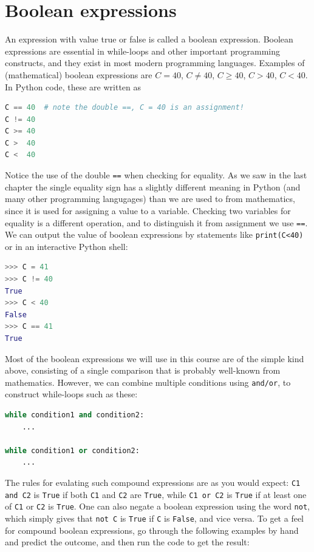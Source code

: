 \documentclass[graybox,envcountchap,sectrefs,final]{svmonodo}
\begin{document}
\section{Boolean expressions}
An expression with value true or false is called a boolean expression. Boolean expressions are essential in
while-loops and other important programming constructs, and they exist in most modern programming languages. Examples
of (mathematical) boolean expressions are $C=40$, $C\neq 40$, $C\geq 40$, $C>40$, $C<40$. In Python code, these
are written as
\begin{lstlisting}[language=Python,style=blue1bar]
C == 40  # note the double ==, C = 40 is an assignment!
C != 40
C >= 40
C >  40
C <  40
\end{lstlisting}
Notice the use of the double \texttt{==} when checking for equality. As we saw in the last chapter the single equality sign
has a slightly different meaning in Python (and many other programming langugages) than we are used to from mathematics,
since it is used for assigning a value to a variable. Checking two variables for equality is a different operation, and
to distinguish it from assignment we use \texttt{==}.
We can output the value of boolean expressions by statements like \texttt{print(C<40)} or in an interactive Python shell:
\begin{lstlisting}[language=Python,style=blue1]
>>> C = 41
>>> C != 40
True
>>> C < 40
False
>>> C == 41
True
\end{lstlisting}
Most of the boolean expressions we will use in this course are of the simple kind above, consisting of a single
comparison that is probably well-known from mathematics. However, we can combine multiple conditions using
\texttt{and/or}, to construct while-loops such as these:
\begin{lstlisting}[language=Python,style=blue1]
while condition1 and condition2:
    ...

while condition1 or condition2:
    ...
\end{lstlisting}
The rules for evalating such compound expressions are as you would expect: \texttt{C1 and C2} is \texttt{True} if both \texttt{C1} and \texttt{C2} are \texttt{True}, while \texttt{C1 or C2} is \texttt{True} if at least one of \texttt{C1} or \texttt{C2} is \texttt{True}. One can also negate a boolean
expression using the word \texttt{not}, which simply gives that \texttt{not C} is \texttt{True} if \texttt{C} is \texttt{False}, and vice versa.
To get a feel for compound boolean expressions, go through the following
examples by hand and predict the outcome, and then run the code to get the result:
\end{document}
